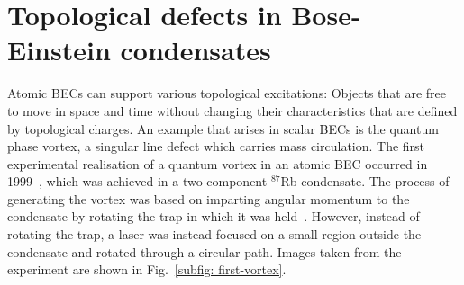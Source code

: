 \section{Topological defects in Bose-Einstein condensates}
Atomic BECs can support various topological excitations: Objects that are free
to move in space and time without changing their characteristics that are
defined by topological charges.
An example that arises in scalar BECs is the quantum phase vortex, a singular
line defect which carries mass circulation.
The first experimental realisation of a quantum vortex in an atomic BEC occurred
in 1999~\cite{Matthews1999}, which was achieved in a two-component \(^{87}\)Rb
condensate.
The process of generating the vortex was based on imparting angular momentum
to the condensate by rotating the trap in which it was held~\cite{Williams1999}.
However, instead of rotating the trap, a laser was instead focused on a small
region outside the condensate and rotated through a circular path.
Images taken from the experiment are shown in Fig.~\ref{subfig: first-vortex}.
